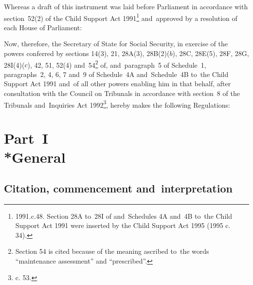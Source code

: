 \documentclass[12pt,a4paper]{article}
\title{\regstitle}
\author{S.I.~1996 No.~2907}
\date{Made 20th November 1996\\Coming into~force 2nd December 1996}
\begin{document}
\maketitle



\medskip

\noindent
Whereas a draft of this instrument was laid before Parliament in accordance with
section~52(2) of the Child Support Act 1991\footnote{\frenchspacing 1991.c.48.
Section 28A to~28I of and~Schedules 4A and~4B to~the Child Support Act 1991 were
inserted by the Child Support Act 1995 (1995 c. 34).} and~approved by a
resolution of each House of Parliament:

Now, therefore, the Secretary of State for Social Security, in exercise of the
powers conferred by sections 14(3), 21, 28A(3), 28B(2)($b$), 28C, 28E(5), 28F,
28G, 28I(4)($c$), 42, 51, 52(4) and~54\footnote{\frenchspacing Section 54 is cited
because of the meaning ascribed to~the words “maintenance assessment” and
“prescribed”.} of, and~paragraph~5 of Schedule~1, paragraphs~2, 4, 6, 7 and~9 of
Schedule~4A and~Schedule~4B to~the Child Support Act 1991 and~of all other
powers enabling him in that behalf, after consultation with the Council on
Tribunals in accordance with section~8 of the Tribunals and~Inquiries Act
1992\footnote{ c. 53.}, hereby makes the following
Regulations:

{\sloppy

\tableofcontents

}

\setcounter{secnumdepth}{-2}

\section[Part~I --- General]{Part~I\\*General}

\subsection[1. Citation, commencement and~interpretation]{Citation, commencement and~interpretation}
\end{document}
